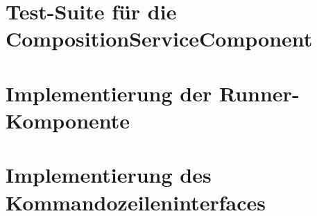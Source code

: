 \documentclass[
    ngerman,
    parskip=half
]{scrartcl}
\begin{document}
\clearpage

\section{Test-Suite für die CompositionServiceComponent}


\clearpage

\section{Implementierung der Runner-Komponente}


\clearpage

\section{Implementierung des Kommandozeileninterfaces}

\end{document}

